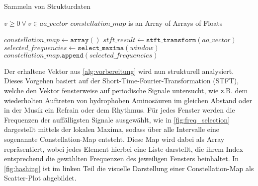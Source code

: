         \begin{algorithm}
            \caption{Sammeln von Strukturdaten}\label{alg:strukturdaten}
            \begin{algorithmic}
                \Require $v \geq 0\ \forall\ v \in aa\_vector$ 
                \Ensure $constellation\_map$ is an Array of Arrays of Floats

                \State $constellation\_map \gets \texttt{array}()$
                \State $stft\_result \gets \texttt{stft\_transform}(aa\_vector)$
                    \State $selected\_frequencies \gets \texttt{select\_maxima}(window)$
                    \State $constellation\_map.\texttt{append}(selected\_frequencies)$
                \EndFor
            \end{algorithmic}
        \end{algorithm}
        Der erhaltene Vektor aus \autoref{alg:vorbereitung} wird nun strukturell analysiert. Dieses Vorgehen basiert auf der Short-Time-Fourier-Transformation (STFT), welche den Vektor fensterweise auf periodische Signale untersucht, wie z.B. dem wiederholten Auftreten von hydrophoben Aminosäuren im gleichen Abstand oder in der Musik ein Refrain oder dem Rhythmus. Für jedes Fenster werden die Frequenzen der auffälligsten Signale ausgewählt, wie in \autoref{fig:freq_selection} dargestellt mittels der lokalen Maxima, sodass über alle Intervalle eine sogenannte Constellation-Map entsteht. Diese Map wird dabei als Array repräsentiert, wobei jedes Element hierbei eine Liste darstellt, die ihrem Index entsprechend die gewählten Frequenzen des jeweiligen Fensters beinhaltet. In \autoref{fig:hashing} ist im linken Teil die visuelle Darstellung einer Constellation-Map als Scatter-Plot abgebildet.

